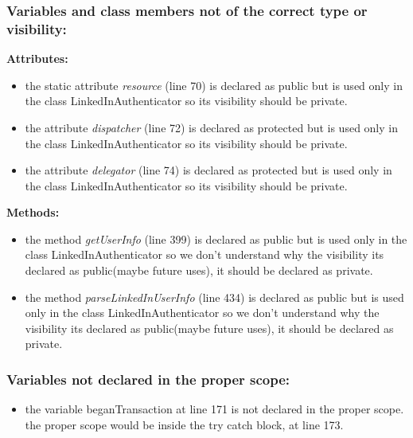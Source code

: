 \subsubsection{Variables and class members not of the correct type or visibility:}
\textbf{Attributes:}
\begin{itemize}
\item the static attribute \textit{resource} (line 70) is declared as public but is used only in the class LinkedInAuthenticator so its visibility should be private.
\item the attribute \textit{dispatcher} (line 72) is declared as protected but is used only in the class LinkedInAuthenticator so its visibility should be private.
\item the attribute \textit{delegator} (line 74) is declared as protected but is used only in the class LinkedInAuthenticator so its visibility should be private.
\end{itemize}
\textbf{Methods:}
\begin{itemize}
\item the method \textit{getUserInfo} (line 399) is declared as public but is used only in the class LinkedInAuthenticator so we don't understand why the visibility its declared as public(maybe future uses), it should be declared as private.
\item the method \textit{parseLinkedInUserInfo} (line 434) is declared as public but is used only in the class LinkedInAuthenticator so we don't understand why the visibility its declared as public(maybe future uses), it should be declared as private.
\end{itemize}
\subsubsection{Variables not declared in the proper scope:}
\begin{itemize}
\item the variable beganTransaction at line 171 is not declared in the proper scope. the proper scope would be inside the try catch block, at line 173.
\end{itemize}

